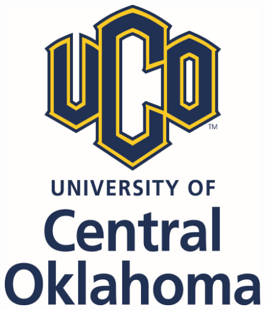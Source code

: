 \documentclass[a0,landscape]{a0poster}
\begin{document}
\begin{figure}[!htb]
\begin{minipage}[b]{0.19\linewidth}
\includegraphics[height=.8\columnwidth,keepaspectratio]{uco_logo.png} %
\end{minipage}
\end{figure}
%
\vspace{1cm} %

\end{document}
